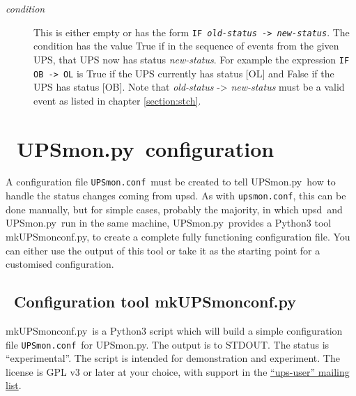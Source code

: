 \documentclass[12pt]{article}
\newlength{\headersep}\setlength{\headersep}{3mm}
\newcommand{\Hsep}{\hspace{\headersep}}
\newcommand{\newcolumn}{\vfill\eject}
\newcommand{\upsd}{\mbox{\textcolor{UPSDCOLOUR}{upsd}}}
\newcommand{\UPSmon}{\mbox{\textcolor{UPSMONCOLOUR}{UPSmon.py}}}
\newcommand{\mkUPSmonconf}{\mbox{\textcolor{UPSMONCOLOUR}{mkUPSmonconf.py}}}
\newcommand{\status}[1]{\textcolor{UPSDCOLOUR}{[{#1}]}}
\newcommand{\upsmonconf}{\textcolor{MONCOLOUR}{\texttt{upsmon.conf}}}
\newcommand{\UPSmonconf}{\textcolor{UPSMONCOLOUR}{\texttt{UPSmon.conf}}}
\newcommand{\mailinglist}{\href{https://lists.alioth.debian.org/mailman/listinfo/nut-upsuser}%
                               {``ups-user'' mailing list}}
\begin{document}
\begin{description}
\begin{description}
\end{description}

\item[\textit{condition}] \hspace{7mm} This is either empty or has the form
  \texttt{IF \textit{old-status} -> \textit{new-status}}. The condition has
  the value True if in the sequence of events from the given UPS, that UPS now
  has status \textit{new-status}.  For example the expression \texttt{IF OB
    -> OL} is True if the UPS currently has status \status{OL} and False if
  the UPS has status \status{OB}.  Note that \textit{old-status} ->
  \textit{new-status} must be a valid event as listed in chapter
  \ref{section:stch}.

\end{description}

\vspace*{\fill}

\begin{center}
\end{center}

\vspace*{\fill}

\newcolumn
\section{\Hsep\ \UPSmon\ configuration}\label{section:conf}

A configuration file \UPSmonconf\ must be created to tell \UPSmon\ how to
handle the status changes coming from \upsd.  As with \upsmonconf, this can be
done manually, but for simple cases, probably the majority, in which
\upsd\ and \UPSmon\ run in the same machine, \UPSmon\ provides a Python3 tool
\mkUPSmonconf, to create a complete fully functioning configuration file.  You
can either use the output of this tool or take it as the starting point for a
customised configuration.

\subsection{\Hsep\ Configuration tool \mkUPSmonconf}\label{section:mkUPSmonconf}

\mkUPSmonconf\ is a Python3 script which will build a simple configuration
file \UPSmonconf\ for \UPSmon.  The output is to STDOUT. The status is
``experimental''. The script is intended for demonstration and experiment.
The license is GPL v3 or later at your choice, with support in the
\mailinglist.
\end{document}
